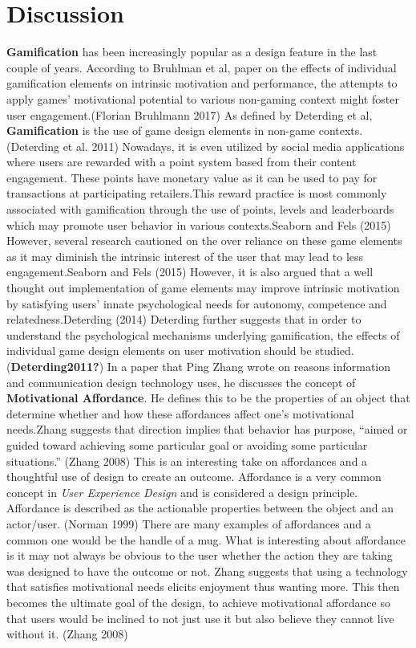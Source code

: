 \documentclass[
]{article}
\begin{document}
\hypertarget{discussion}{%
\section{Discussion}\label{discussion}}

\textbf{Gamification} has been increasingly popular as a design feature in the last couple of years. According to Bruhlman et al, paper on the effects of individual gamification elements on intrinsic motivation and performance, the attempts to apply games' motivational potential to various non-gaming context might foster user engagement.(Florian Bruhlmann 2017) As defined by Deterding et al, \textbf{Gamification} is the use of game design elements in non-game contexts.(Deterding et al. 2011) Nowadays, it is even utilized by social media applications where users are rewarded with a point system based from their content engagement. These points have monetary value as it can be used to pay for transactions at participating retailers.This reward practice is most commonly associated with gamification through the use of points, levels and leaderboards which may promote user behavior in various contexts.Seaborn and Fels (2015) However, several research cautioned on the over reliance on these game elements as it may diminish the intrinsic interest of the user that may lead to less engagement.Seaborn and Fels (2015) However, it is also argued that a well thought out implementation of game elements may improve intrinsic motivation by satisfying users' innate psychological needs for autonomy, competence and relatedness.Deterding (2014) Deterding further suggests that in order to understand the psychological mechanisms underlying gamification, the effects of individual game design elements on user motivation should be studied.(\textbf{Deterding2011?}) In a paper that Ping Zhang wrote on reasons information and communication design technology uses, he discusses the concept of \textbf{Motivational Affordance}. He defines this to be the properties of an object that determine whether and how these affordances affect one's motivational needs.Zhang suggests that direction implies that behavior has purpose, ``aimed or guided toward achieving some particular goal or avoiding some particular situations.'' (Zhang 2008) This is an interesting take on affordances and a thoughtful use of design to create an outcome. Affordance is a very common concept in \emph{User Experience Design} and is considered a design principle. Affordance is described as the actionable properties between the object and an actor/user. (Norman 1999) There are many examples of affordances and a common one would be the handle of a mug. What is interesting about affordance is it may not always be obvious to the user whether the action they are taking was designed to have the outcome or not. Zhang suggests that using a technology that satisfies motivational needs elicits enjoyment thus wanting more. This then becomes the ultimate goal of the design, to achieve motivational affordance so that users would be inclined to not just use it but also believe they cannot live without it. (Zhang 2008)
\end{document}
